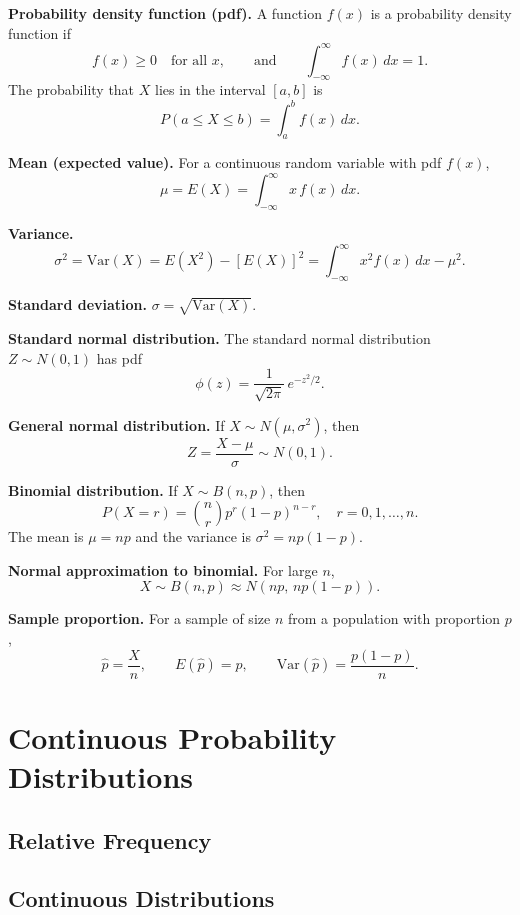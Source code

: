 \documentclass[12pt]{article}
\begin{document}
\textbf{Probability density function (pdf).} A function $f(x)$ is a probability density function if
\[
f(x) \geq 0 \quad \text{for all } x, \qquad \text{and} \qquad \int_{-\infty}^{\infty} f(x)\,dx = 1.
\]
The probability that $X$ lies in the interval $[a,b]$ is
\[
P(a \leq X \leq b) = \int_a^b f(x)\,dx.
\]

\textbf{Mean (expected value).} For a continuous random variable with pdf $f(x)$,
\[
\mu = E(X) = \int_{-\infty}^{\infty} x\,f(x)\,dx.
\]

\textbf{Variance.}
\[
\sigma^2 = \mathrm{Var}(X) = E(X^2) - [E(X)]^2 = \int_{-\infty}^{\infty} x^2 f(x)\,dx - \mu^2.
\]

\textbf{Standard deviation.} $\sigma = \sqrt{\mathrm{Var}(X)}$.

\textbf{Standard normal distribution.} The standard normal distribution $Z \sim N(0,1)$ has pdf
\[
\phi(z) = \frac{1}{\sqrt{2\pi}}\,e^{-z^2/2}.
\]

\textbf{General normal distribution.} If $X \sim N(\mu, \sigma^2)$, then
\[
Z = \frac{X - \mu}{\sigma} \sim N(0,1).
\]

\textbf{Binomial distribution.} If $X \sim B(n, p)$, then
\[
P(X = r) = \binom{n}{r} p^r (1-p)^{n-r}, \quad r = 0, 1, \ldots, n.
\]
The mean is $\mu = np$ and the variance is $\sigma^2 = np(1-p)$.

\textbf{Normal approximation to binomial.} For large $n$,
\[
X \sim B(n,p) \approx N\!\left(np,\, np(1-p)\right).
\]

\textbf{Sample proportion.} For a sample of size $n$ from a population with proportion $p$,
\[
\hat{p} = \frac{X}{n}, \qquad E(\hat{p}) = p, \qquad \mathrm{Var}(\hat{p}) = \frac{p(1-p)}{n}.
\]

\section{Continuous Probability Distributions}

\subsection{Relative Frequency}


\subsection{Continuous Distributions}

\end{document}
